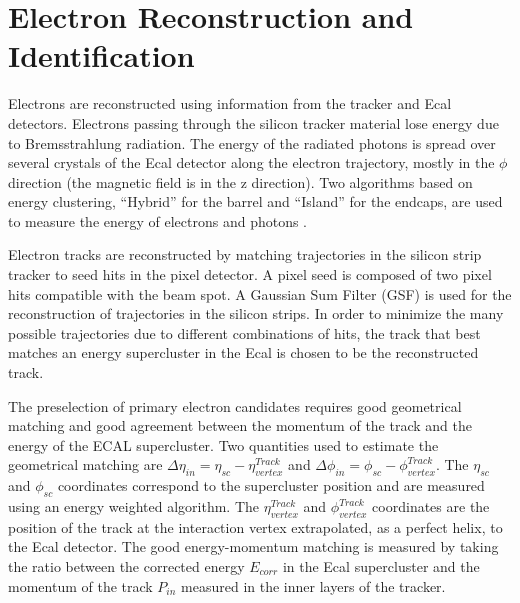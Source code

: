 \chapter{Electron Reconstruction and Identification}
\label{mathchapter}

\label{eID}

Electrons are reconstructed using information from the  tracker and Ecal detectors. Electrons
passing through the  silicon tracker material lose energy due to Bremsstrahlung  radiation. The
energy of the radiated photons is spread  over several crystals of the Ecal detector along the 
electron trajectory, mostly in the $\phi$ direction  (the magnetic field is in the z direction).
Two algorithms  based on energy clustering, ``Hybrid'' for the barrel and  ``Island'' for the
endcaps, are used to measure the energy  of electrons and photons \cite{eRecoCMS}.

Electron tracks are reconstructed by matching trajectories  in the silicon strip tracker to seed
hits in the pixel  detector. A pixel seed is composed of two pixel hits  compatible with the beam
spot. A Gaussian Sum Filter (GSF)  is used for the reconstruction of trajectories in the  silicon
strips. In order to minimize the many possible  trajectories due to different combinations of hits,
the  track that best matches an energy supercluster in the Ecal  is chosen to be the reconstructed
track.

The preselection of primary electron candidates requires  good geometrical matching and good
agreement between the  momentum of the track and the energy of the ECAL  supercluster. Two
quantities used to estimate the geometrical matching are $\Delta \eta_{in} = \eta_{sc}
-\eta^{Track}_{vertex}$ and  $\Delta \phi_{in} = \phi_{sc} -\phi^{Track}_{vertex}$. The $\eta_{sc}$
and $\phi_{sc}$ coordinates correspond to  the supercluster position and are measured using an
energy weighted algorithm. The $\eta^{Track}_{vertex}$ and  $\phi^{Track}_{vertex}$ coordinates are
the position of the track at the interaction vertex extrapolated,  as a perfect helix, to the Ecal
detector. The good energy-momentum matching is measured by taking the ratio  between the corrected
energy $E_{corr}$ in the Ecal  supercluster and the momentum of the track $P_{in}$  measured in the
inner layers of the tracker.

